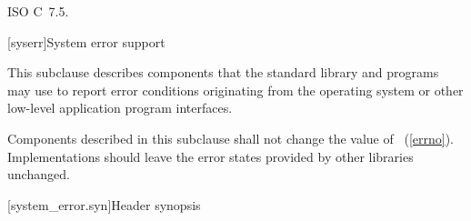 \xref ISO C~7.5.

[syserr]{System error support}

\pnum
This subclause describes components that the standard library and
\Cpp programs may use to report error conditions originating from
the operating system or other low-level application program interfaces.

\pnum
Components described in this subclause shall not change the value of
~(\ref{errno}).
Implementations should leave the error states provided by other
libraries unchanged.

[system_error.syn]{Header  synopsis}
%
%
%
%
%
%
%
%
%
%
%

